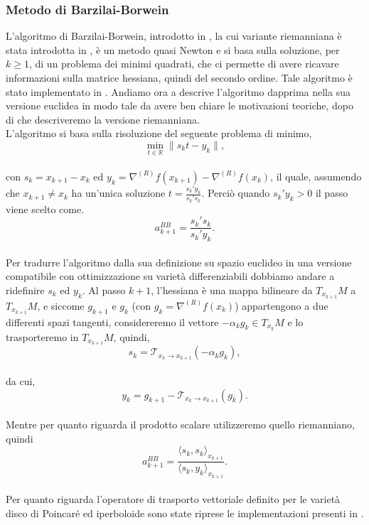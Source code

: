 \documentclass[a4paper, 12pt]{article}
\begin{document}
\subsubsection{Metodo di Barzilai-Borwein}
L'algoritmo di Barzilai-Borwein, introdotto in \cite{barzilaiBorwein}, la cui variante riemanniana è stata introdotta in \cite{Iannazzo}, è un metodo quasi Newton e si basa sulla soluzione, per $k \geq 1$, di un problema dei minimi quadrati, che ci permette di avere ricavare informazioni sulla matrice hessiana, quindi del secondo ordine. Tale algoritmo è stato implementato in \cite{Iannazzo}. Andiamo ora a descrive l'algoritmo dapprima nella sua versione euclidea in modo tale da avere ben chiare le motivazioni teoriche, dopo di che descriveremo la versione riemanniana.\\
L'algoritmo si basa sulla risoluzione del seguente problema di minimo,\\
\[\min_{t \in \mathbb{R}} \| s_kt - y_k \|,\]\\
con $s_k = x_{k+1} - x_k$ ed $y_k = \nabla^{(R)} f(x_{k+1}) - \nabla^{(R)} f(x_k)$, il quale, assumendo che $x_{k+1} \neq x_k$ ha un'unica soluzione $t = \frac{s_k'y_k}{s_k's_k}$. Perciò quando $s_k'y_k > 0$ il passo viene scelto come.\\
\[a_{k+1}^{BB} = \frac{s_k's_k}{s_k'y_k}.\]\\
Per tradurre l'algoritmo dalla sua definizione su spazio euclideo in una versione compatibile con ottimizzazione su varietà differenziabili dobbiamo andare a ridefinire $s_k$ ed $y_k$. Al passo $k+1$, l'hessiana è una mappa bilineare da $T_{x_{k+1}}M$ a $T_{x_{k+1}}M$, e siccome $g_{k+1}$ e $g_{k}$ (con $g_k = \nabla^{(R)} f(x_k)$) appartengono a due differenti spazi tangenti, considereremo il vettore $-\alpha_kg_k \in T_{x_k}M$ e lo trasporteremo in $T_{x_{k+1}}M$, quindi,\\
\[s_k = \mathcal{T}_{x_k \to x_{k+1}}(-\alpha_kg_k),\]\\
da cui,\\
\[y_k = g_{k+1} - \mathcal{T}_{x_k \to x_{k+1}}(g_k).\]\\
Mentre per quanto riguarda il prodotto scalare utilizzeremo quello riemanniano, quindi\\
\[a_{k+1}^{BB} = \frac{\langle s_k,s_k \rangle_{x_{k+1}}}{\langle s_k,y_k \rangle_{x_{k+1}}}.\]\\
Per quanto riguarda l'operatore di trasporto vettoriale definito per le varietà disco di Poincaré ed iperboloide sono state riprese le implementazioni presenti in \cite{ManOpt}.
\end{document}
